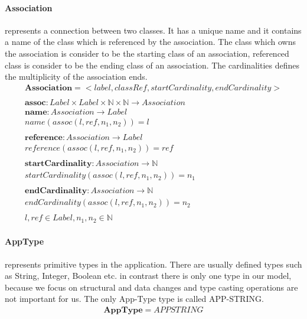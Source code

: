 \documentclass[11pt]{article}
\begin{document}
\paragraph {Association} represents a connection between two classes. It has a unique name and it contains a name of the class which is referenced by the association. The class which owns the association is consider to be the starting class of an association, referenced class is consider to be the ending class of an association. The cardinalities defines the multiplicity of the association ends.
\begin{align*}
	\mathbf{Association} = <label, classRef, startCardinality, endCardinality> \\ \\
	\mathbf{assoc} : Label \times Label \times \mathbb{N} \times \mathbb{N} \rightarrow Association\\
	\mathbf{name} : Association \rightarrow Label \\
	name(assoc(l, ref, n_1, n_2)) = l\\ \\
	\mathbf{reference} : Association \rightarrow Label \\
	reference(assoc(l, ref, n_1, n_2)) = ref\\ \\
	\mathbf{startCardinality} : Association \rightarrow \mathbb{N} \\
	startCardinality(assoc(l, ref, n_1, n_2)) = n_1\\ \\
	\mathbf{endCardinality} : Association \rightarrow \mathbb{N} \\
	endCardinality(assoc(l, ref, n_1, n_2)) = n_2 \\ \\
l, ref \in Label,  n_1, n_2 \in \mathbb{N}
\end{align*}



\paragraph{AppType} represents primitive types in the application. There are usually defined types such as String, Integer, Boolean etc. in contrast there is only one type in our model, because we focus on structural and data changes and type casting operations are not important for us. The only App-Type type is called APP-STRING.
\begin{align*}
\mathbf{AppType} = APPSTRING
\end{align*}
\end{document}
